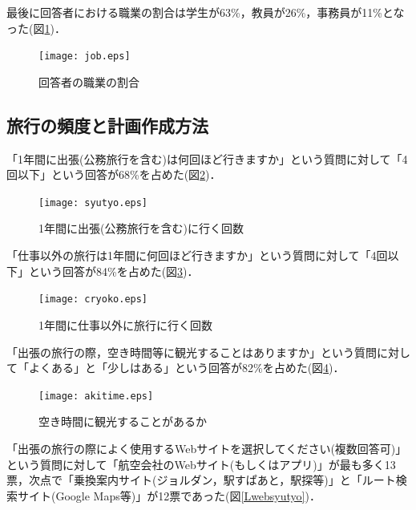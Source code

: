 \documentclass{funthesis}
\begin{document}
\clearpage

最後に回答者における職業の割合は学生が63\%，教員が26\%，事務員が11\%となった(図\ref{Ljob})．

\begin{figure}[htpb]
\begin{center}
\texttt{[image: job.eps]}
\end{center}
\caption{回答者の職業の割合}
\label{Ljob}
\end{figure}

\clearpage

\subsection{旅行の頻度と計画作成方法}

「1年間に出張(公務旅行を含む)は何回ほど行きますか」という質問に対して「4回以下」という回答が68\%を占めた(図\ref{Lsyutyo})．

\begin{figure}[htpb]
\begin{center}
\texttt{[image: syutyo.eps]}
\end{center}
\caption{1年間に出張(公務旅行を含む)に行く回数}
\label{Lsyutyo}
\end{figure}

\clearpage

「仕事以外の旅行は1年間に何回ほど行きますか」という質問に対して「4回以下」という回答が84\%を占めた(図\ref{Lcryoko})．

\begin{figure}[htpb]
\begin{center}
\texttt{[image: cryoko.eps]}
\end{center}
\caption{1年間に仕事以外に旅行に行く回数}
\label{Lcryoko}
\end{figure}

\clearpage

「出張の旅行の際，空き時間等に観光することはありますか」という質問に対して「よくある」と「少しはある」という回答が82\%を占めた(図\ref{Lakitime})．

\begin{figure}[htpb]
\begin{center}
\texttt{[image: akitime.eps]}
\end{center}
\caption{空き時間に観光することがあるか}
\label{Lakitime}
\end{figure}

\clearpage

「出張の旅行の際によく使用するWebサイトを選択してください(複数回答可)」という質問に対して「航空会社のWebサイト(もしくはアプリ)」が最も多く13票，次点で「乗換案内サイト(ジョルダン，駅すぱあと，駅探等)」と「ルート検索サイト(Google Maps等)」が12票であった(図\ref{Lwebsyutyo})．
\end{document}
